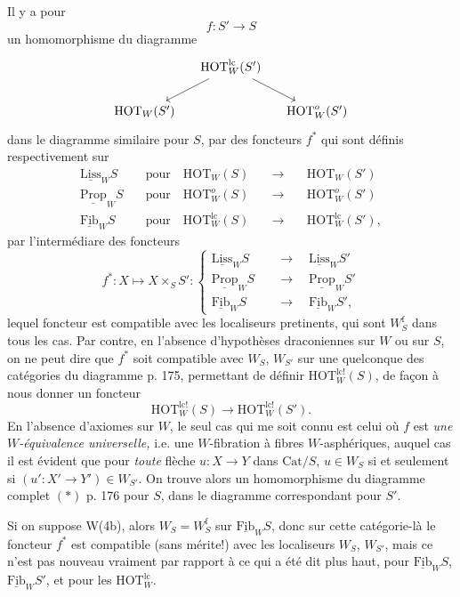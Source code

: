 \documentclass[11pt]{article}
\newcommand{\printedpage}[1]{\marginpar{\footnotesize p.~#1}}
\newcommand{\msp}[1]{\marginpar{\footnotesize [#1]}}
\newcommand{\und}[1]{\underline{\mathrm{#1}}}
\begin{document}
Il y a pour
\[
f : S' \longrightarrow S
\]
un homomorphisme du diagramme
\[
\begin{tikzcd}[column sep=small]
& \mathrm{HOT}^{\mathrm{lc}}_W(S') \arrow[dl] \arrow[dr] & \\
\mathrm{HOT}_W(S') & & \mathrm{HOT}^{o}_W(S')
\end{tikzcd}
\]
\msp{page 198}
dans le diagramme similaire pour $S$, par des foncteurs $f^*$ qui sont définis respectivement sur
\[
\begin{aligned}
\und{Liss}_W S &\quad \text{pour}\quad \mathrm{HOT}_W(S) & \quad\longrightarrow\quad & \mathrm{HOT}_W(S')\\
\und{Prop}_W S &\quad \text{pour}\quad \mathrm{HOT}^{o}_W(S) & \quad\longrightarrow\quad & \mathrm{HOT}^{o}_W(S')\\
\und{Fib}_W S &\quad \text{pour}\quad \mathrm{HOT}^{\mathrm{lc}}_W(S) & \quad\longrightarrow\quad & \mathrm{HOT}^{\mathrm{lc}}_W(S'),
\end{aligned}
\]
par l'intermédiare des foncteurs %
\[
f^* : X \longmapsto X \times_S S' : \left\{
\begin{aligned}
\und{Liss}_W S &\quad\longrightarrow\quad \und{Liss}_W S'\\
\und{Prop}_W S &\quad\longrightarrow\quad \und{Prop}_W S'\\
\und{Fib}_W S &\quad\longrightarrow\quad \und{Fib}_W S',
\end{aligned}
\right.
\]
lequel foncteur est compatible avec les localiseurs pretinents, qui sont $W_S^{\mathrm{f}}$ dans tous les cas. Par contre, en l'absence d'hypothèses draconiennes sur $W$ ou sur $S$, on ne peut dire que $f^*$ soit compatible avec $W_S$, $W_{S'}$ sur une quelconque des catégories du diagramme p. 175, permettant de définir $\mathrm{HOT}^{\mathrm{lc!}}_W(S)$, de façon à nous donner un foncteur %
\[
\mathrm{HOT}^{\mathrm{lc!}}_W(S) \longrightarrow \mathrm{HOT}^{\mathrm{lc!}}_W(S').
\]
En l'absence d'axiomes sur $W$, le seul cas qui me soit connu est celui où $f$ est \textit{une $W$-équivalence universelle,} i.e. une $W$-fibration à fibres $W$-asphériques, auquel cas il est évident que pour \textit{toute} flèche $u : X \longrightarrow Y$ dans $\mathrm{Cat}/S$, $u \in W_S$ si et seulement si $(u' : X' \longrightarrow Y') \in W_{S'}$. On trouve alors un homomorphisme du diagramme complet $(*)$ p. 176 pour $S$, dans le diagramme correspondant pour $S'$.

Si on suppose W(4b), alors $W_S = W_S^{\mathrm{f}}$ sur $\und{Fib}_W S$, donc sur cette catégorie-là le foncteur $f^*$ est compatible (sans mérite!) avec les localiseurs $W_S$, $W_{S'}$, mais ce n'est pas nouveau vraiment
\printedpage{123}
\msp{page 199}
par rapport à ce qui a été dit plus haut, pour $\und{Fib}_W S$, $\und{Fib}_W S'$, et pour les $\mathrm{HOT}^{\mathrm{lc}}_W$.
\end{document}
